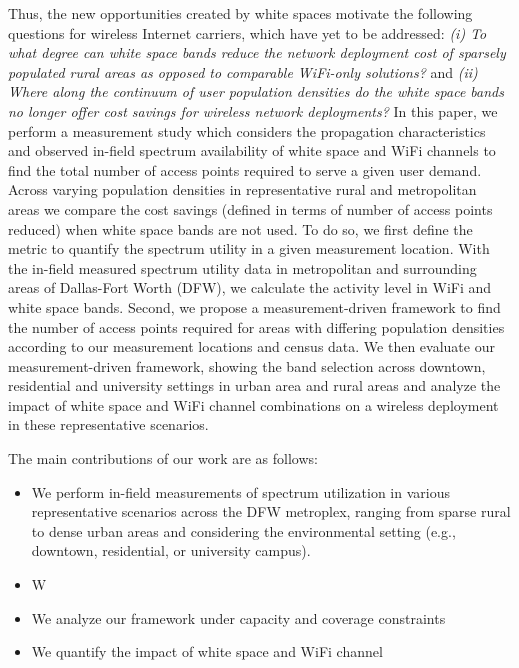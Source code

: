 Thus, the new opportunities created by white spaces motivate the following 
questions for wireless Internet carriers, which have yet to be addressed: 
{\it (i) To what degree can white space bands reduce the network deployment cost of
sparsely populated rural areas as opposed to comparable WiFi-only solutions?} and 
{\it (ii) Where along the continuum of user population densities do the white
space bands no longer offer cost savings for wireless network deployments?}
In this paper, we perform a measurement study which considers the propagation 
characteristics and observed in-field spectrum availability of white space
and WiFi channels to find the total number of access points required to serve a 
given user demand. Across varying population densities in representative 
rural and metropolitan areas we compare the cost savings (defined in terms of
number of access points reduced) when white space bands are not used.
To do so, we first define the metric to quantify the spectrum utility in a
given measurement location. With the in-field measured spectrum utility data 
in metropolitan and surrounding areas of Dallas-Fort Worth (DFW), we 
calculate the activity level in WiFi and white space bands. Second, we 
propose a measurement-driven framework to find the number of access points required 
for areas with differing population densities according to our measurement locations
and census data. We then evaluate our measurement-driven framework, showing
the band selection across downtown, residential and university settings in
urban area and rural areas and analyze the impact of white space and WiFi
channel combinations on a wireless deployment in these representative scenarios.

The main contributions of our work are as follows:
\begin{itemize}
\item We perform in-field measurements of spectrum utilization in various representative
scenarios across the DFW metroplex, ranging from sparse rural to dense urban areas and 
considering the environmental setting (e.g., downtown, residential, or university campus).
\item W
\item We analyze our framework under capacity and coverage constraints 
\item We quantify the impact of white space and WiFi channel
\end{itemize}


